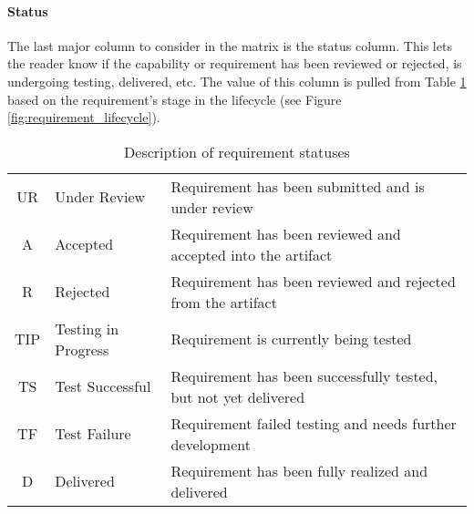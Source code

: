 \paragraph*{Status} The last major column to consider in the matrix is the status column.
This lets the reader know if the capability or requirement has been reviewed or rejected, is undergoing testing, delivered, etc.
The value of this column is pulled from Table \ref{tab:req_status} based on the requirement's stage in the lifecycle (see Figure \ref{fig:requirement_lifecycle}).

\begin{table}
    \renewcommand{\arraystretch}{1.5}
    \centering
    \caption{Description of requirement statuses}
    \begin{tabular}{|c | p{} || p{}|}
        \hline
        UR  & Under Review          & Requirement has been submitted and is under review \\
        A   & Accepted              & Requirement has been reviewed and accepted into the artifact \\
        R   & Rejected              & Requirement has been reviewed and rejected from the artifact \\
        TIP & Testing in Progress   & Requirement is currently being tested \\
        TS  & Test Successful       & Requirement has been successfully tested, but not yet delivered \\
        TF  & Test Failure          & Requirement failed testing and needs further development \\
        D   & Delivered             & Requirement has been fully realized and delivered \\
        \hline
    \end{tabular}
    \label{tab:req_status}
\end{table}

